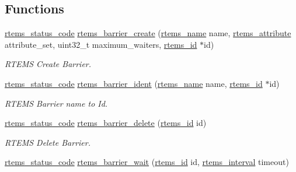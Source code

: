 \subsection*{Functions}
\begin{DoxyCompactItemize}
\item 
\mbox{\hyperlink{group__ClassicStatus_ga545d41846817eaba6143d52ee4d9e9fe}{rtems\+\_\+status\+\_\+code}} \mbox{\hyperlink{group__ClassicBarrier_gac0840f8a73784a6c2a97474bcc03cb42}{rtems\+\_\+barrier\+\_\+create}} (\mbox{\hyperlink{group__ClassicTasks_ga55fb63c49f68c0cbd9bee004da15b1fd}{rtems\+\_\+name}} name, \mbox{\hyperlink{group__ClassicAttributes_gaea40313cf78ed843e09c4315d0a10f79}{rtems\+\_\+attribute}} attribute\+\_\+set, uint32\+\_\+t maximum\+\_\+waiters, \mbox{\hyperlink{group__ClassicTasks_gab20892b814dced7dd4e5b9bf42becd57}{rtems\+\_\+id}} $\ast$id)
\begin{DoxyCompactList}\small\item\em R\+T\+E\+MS Create Barrier. \end{DoxyCompactList}\item 
\mbox{\hyperlink{group__ClassicStatus_ga545d41846817eaba6143d52ee4d9e9fe}{rtems\+\_\+status\+\_\+code}} \mbox{\hyperlink{group__ClassicBarrier_gacd188b64c48e0478c26cbdb9da4e53d3}{rtems\+\_\+barrier\+\_\+ident}} (\mbox{\hyperlink{group__ClassicTasks_ga55fb63c49f68c0cbd9bee004da15b1fd}{rtems\+\_\+name}} name, \mbox{\hyperlink{group__ClassicTasks_gab20892b814dced7dd4e5b9bf42becd57}{rtems\+\_\+id}} $\ast$id)
\begin{DoxyCompactList}\small\item\em R\+T\+E\+MS Barrier name to Id. \end{DoxyCompactList}\item 
\mbox{\hyperlink{group__ClassicStatus_ga545d41846817eaba6143d52ee4d9e9fe}{rtems\+\_\+status\+\_\+code}} \mbox{\hyperlink{group__ClassicBarrier_ga942ec086e0fa6aa0939629fb617a763b}{rtems\+\_\+barrier\+\_\+delete}} (\mbox{\hyperlink{group__ClassicTasks_gab20892b814dced7dd4e5b9bf42becd57}{rtems\+\_\+id}} id)
\begin{DoxyCompactList}\small\item\em R\+T\+E\+MS Delete Barrier. \end{DoxyCompactList}\item 
\mbox{\hyperlink{group__ClassicStatus_ga545d41846817eaba6143d52ee4d9e9fe}{rtems\+\_\+status\+\_\+code}} \mbox{\hyperlink{group__ClassicBarrier_ga46facdb77f3152d01cbd0eb36f399c69}{rtems\+\_\+barrier\+\_\+wait}} (\mbox{\hyperlink{group__ClassicTasks_gab20892b814dced7dd4e5b9bf42becd57}{rtems\+\_\+id}} id, \mbox{\hyperlink{group__ClassicTasks_gad39c43f949683d46874e3a5586b93aee}{rtems\+\_\+interval}} timeout)

\end{DoxyCompactItemize}
